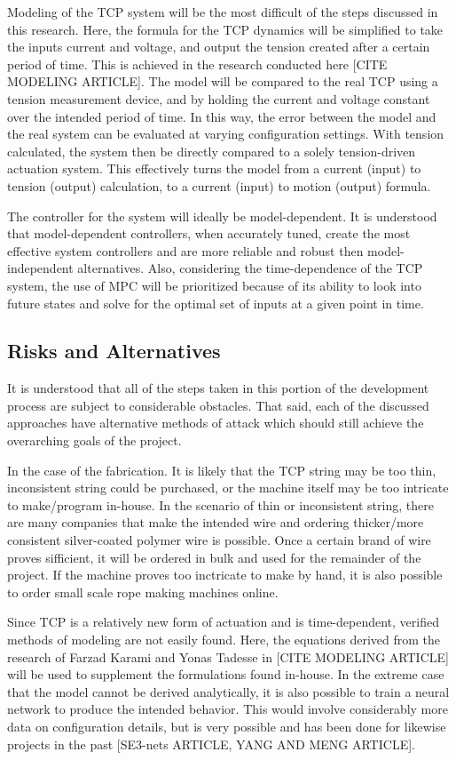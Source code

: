 Modeling of the TCP system will be the most difficult of the steps discussed in this research. Here, the formula for the TCP dynamics will be simplified to take the inputs current and voltage, and output the tension created after a certain period of time. This is achieved in the research conducted here [CITE MODELING ARTICLE]. The model will be compared to the real TCP using a tension measurement device, and by holding the current and voltage constant over the intended period of time. In this way, the error between the model and the real system can be evaluated at varying configuration settings. With tension calculated, the system then be directly compared to a solely tension-driven actuation system. This effectively turns the model from a current (input) to tension (output) calculation, to a current (input) to motion (output) formula.

The controller for the system will ideally be model-dependent. It is understood that model-dependent controllers, when accurately tuned, create the most effective system controllers and are more reliable and robust then model-independent alternatives. Also, considering the time-dependence of the TCP system, the use of MPC will be prioritized because of its ability to look into future states and solve for the optimal set of inputs at a given point in time.

\subsection{Risks and Alternatives}

It is understood that all of the steps taken in this portion of the development process are subject to considerable obstacles. That said, each of the discussed approaches have alternative methods of attack which should still achieve the overarching goals of the project.

In the case of the fabrication. It is likely that the TCP string may be too thin, inconsistent string could be purchased, or the machine itself may be too intricate to make/program in-house. In the scenario of thin or inconsistent string, there are many companies that make the intended wire and ordering thicker/more consistent silver-coated polymer wire is possible. Once a certain brand of wire proves sifficient, it will be ordered in bulk and used for the remainder of the project. If the machine proves too inctricate to make by hand, it is also possible to order small scale rope making machines online.

Since TCP is a relatively new form of actuation and is time-dependent, verified methods of modeling are not easily found. Here, the equations derived from the research of Farzad Karami and Yonas Tadesse in [CITE MODELING ARTICLE] will be used to supplement the formulations found in-house. In the extreme case that the model cannot be derived analytically, it is also possible to train a neural network to produce the intended behavior. This would involve considerably more data on configuration details, but is very possible and has been done for likewise projects in the past [SE3-nets ARTICLE, YANG AND MENG ARTICLE].

